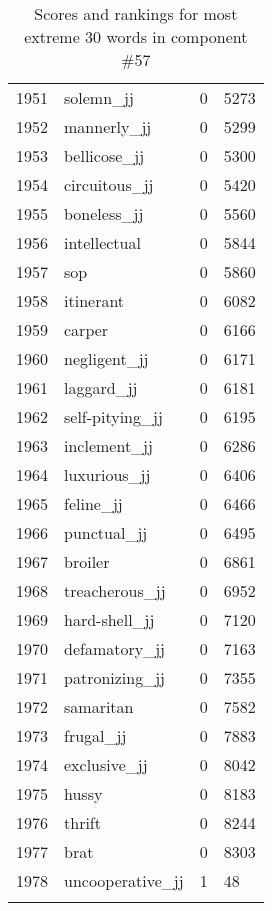\begin{longtable}[!htbp]{| rlr@{.}l |}
    1951 & solemn\_jj & 0 & 5273 \\
    1952 & mannerly\_jj & 0 & 5299 \\
    1953 & bellicose\_jj & 0 & 5300 \\
    1954 & circuitous\_jj & 0 & 5420 \\
    1955 & boneless\_jj & 0 & 5560 \\
    1956 & intellectual & 0 & 5844 \\
    1957 & sop & 0 & 5860 \\
    1958 & itinerant & 0 & 6082 \\
    1959 & carper & 0 & 6166 \\
    1960 & negligent\_jj & 0 & 6171 \\
    1961 & laggard\_jj & 0 & 6181 \\
    1962 & self-pitying\_jj & 0 & 6195 \\
    1963 & inclement\_jj & 0 & 6286 \\
    1964 & luxurious\_jj & 0 & 6406 \\
    1965 & feline\_jj & 0 & 6466 \\
    1966 & punctual\_jj & 0 & 6495 \\
    1967 & broiler & 0 & 6861 \\
    1968 & treacherous\_jj & 0 & 6952 \\
    1969 & hard-shell\_jj & 0 & 7120 \\
    1970 & defamatory\_jj & 0 & 7163 \\
    1971 & patronizing\_jj & 0 & 7355 \\
    1972 & samaritan & 0 & 7582 \\
    1973 & frugal\_jj & 0 & 7883 \\
    1974 & exclusive\_jj & 0 & 8042 \\
    1975 & hussy & 0 & 8183 \\
    1976 & thrift & 0 & 8244 \\
    1977 & brat & 0 & 8303 \\
    1978 & uncooperative\_jj & 1 & 48 \\
    \hline
    \caption{Scores and rankings for most extreme 30 words in component \#57} \\
\end{longtable}
